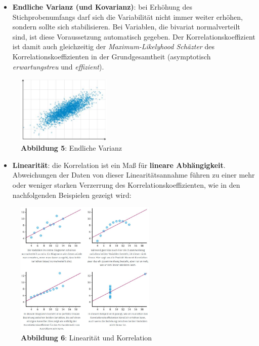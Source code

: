 \documentclass[
]{article}
\providecommand{\tightlist}{%
  \setlength{\itemsep}{0pt}\setlength{\parskip}{0pt}}
\begin{document}
\begin{itemize}
\tightlist
\item
  \textbf{Endliche Varianz (und Kovarianz)}: bei Erhöhung des Stichprobenumfangs darf sich die Variabilität nicht immer weiter erhöhen, sondern sollte sich stabilisieren. Bei Variablen, die bivariat normalverteilt sind, ist diese Voraussetzung automatisch gegeben. Der Korrelationskoeffizient ist damit auch gleichzeitig der \emph{Maximum-Likelyhood Schäzter} des Korrelationskoeffizienten in der Grundgesamtheit (asymptotisch \emph{erwartungstreu} und \emph{effizient}).
\end{itemize}

\begin{figure}
\centering
\includegraphics[width=0.4\textwidth,height=\textheight]{Images/EndlicheVarianz.JPG}
\caption[\textbf{Abbildung 5}: Endliche Varianz]{\textbf{Abbildung 5}: Endliche Varianz\footnotemark{}}
\end{figure}

\begin{itemize}
\tightlist
\item
  \textbf{Linearität}: die Korrelation ist ein Maß für \textbf{lineare Abhängigkeit}. Abweichungen der Daten von dieser Linearitätsannahme führen zu einer mehr oder weniger starken Verzerrung des Korrelationskoeffizienten, wie in den nachfolgenden Beispielen gezeigt wird:
\end{itemize}

\begin{figure}
\centering
\includegraphics[width=0.6\textwidth,height=\textheight]{Images/Linearitaet.JPG}
\caption{\textbf{Abbildung 6}: Linearität und Korrelation}
\end{figure}
\end{document}
